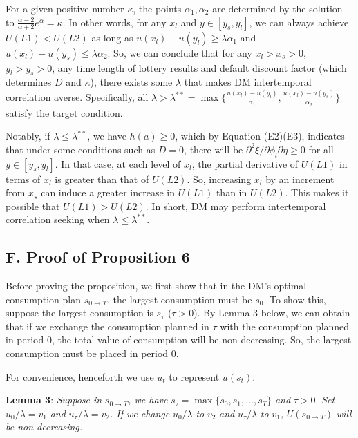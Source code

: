 For a given positive number \(\kappa\), the points \(\alpha_1,\alpha_2\)
are determined by the solution to
\(\frac{\alpha-2}{\alpha+2}e^{\alpha}=\kappa\). In other words, for any
\(x_l\) and \(y\in[y_s,y_l]\), we can always achieve \(U(L1)<U(L2)\) as
long as \(u(x_l)-u(y_l)\geq \lambda\alpha_1\) and
\(u(x_l)-u(y_s)\leq\lambda\alpha_2\). So, we can conclude that for any
\(x_l>x_s>0\), \(y_l>y_s>0\), any time length of lottery results and
default discount factor (which determines \(D\) and \(\kappa\)), there
exists some \(\lambda\) that makes DM intertemporal correlation averse.
Specifically, all
\(\lambda>\lambda^{**} ={\max}\{\frac{u(x_l)-u(y_l)}{\alpha_1},\frac{u(x_l)-u(y_s)}{\alpha_2}\}\)
satisfy the target condition.

Notably, if \(\lambda\leq\lambda^{**}\), we have \(h(a)\geq0\), which by
Equation (E2)(E3), indicates that under some conditions such as \(D=0\),
there will be \(\partial^2 \xi/\partial \phi_l\partial \eta\geq0\) for
all \(y\in[y_s,y_l]\). In that case, at each level of \(x_l\), the
partial derivative of \(U(L1)\) in terms of \(x_l\) is greater than that
of \(U(L2)\). So, increasing \(x_l\) by an increment from \(x_s\) can
induce a greater increase in \(U(L1)\) than in \(U(L2)\). This makes it
possible that \(U(L1)>U(L2)\). In short, DM may perform intertemporal
correlation seeking when \(\lambda\leq\lambda^{**}\).

\hypertarget{f.-proof-of-proposition-6}{%
\subsection*{F. Proof of Proposition
6}\label{f.-proof-of-proposition-6}}

Before proving the proposition, we first show that in the DM's optimal
consumption plan \(s_{0\rightarrow T}\), the largest consumption must be
\(s_0\). To show this, suppose the largest consumption is \(s_\tau\)
(\(\tau>0\)). By Lemma 3 below, we can obtain that if we exchange the
consumption planned in \(\tau\) with the consumption planned in period
0, the total value of consumption will be non-decreasing. So, the
largest consumption must be placed in period 0.

For convenience, henceforth we use \(u_t\) to represent \(u(s_t)\).

\noindent \textbf{Lemma 3}: \emph{Suppose in}
\(s_{0\rightarrow T}\)\emph{, we have}
\(s_\tau= \max\{s_0,s_1,...,s_T\}\) \emph{and} \(\tau>0\). \emph{Set}
\(u_0/\lambda=v_1\) \emph{and} \(u_{\tau}/\lambda=v_2\)\emph{. If we
change} \(u_0/\lambda\) \emph{to} \(v_2\) \emph{and}
\(u_{\tau}/\lambda\) \emph{to} \(v_1\)\emph{,} \(U(s_{0\rightarrow T})\)
\emph{will be non-decreasing.}

